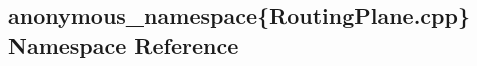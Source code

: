 \hypertarget{namespaceanonymous__namespace_02RoutingPlane_8cpp_03}{\subsection{anonymous\-\_\-namespace\{Routing\-Plane.\-cpp\} Namespace Reference}
\label{namespaceanonymous__namespace_02RoutingPlane_8cpp_03}
}
